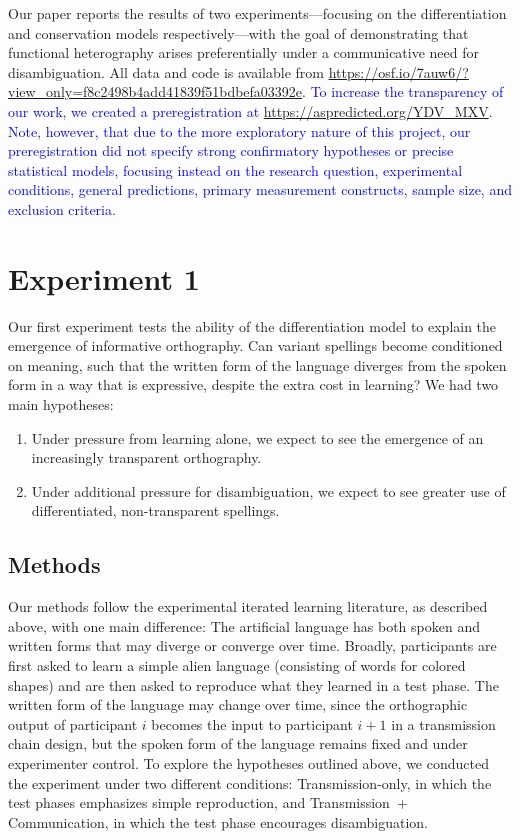 \documentclass[doc,biblatex]{apa7}
\newcommand\newmaterial[1]{\textcolor{blue}{#1}}
\begin{document}
Our paper reports the results of two experiments---focusing on the differentiation and conservation models respectively---with the goal of demonstrating that functional heterography arises preferentially under a communicative need for disambiguation. All data and code is available from \url{https://osf.io/7auw6/?view_only=f8c2498b4add41839f51bdbefa03392e}. \newmaterial{To increase the transparency of our work, we created a preregistration at \url{https://aspredicted.org/YDV_MXV}. Note, however, that due to the more exploratory nature of this project, our preregistration did not specify strong confirmatory hypotheses or precise statistical models, focusing instead on the research question, experimental conditions, general predictions, primary measurement constructs, sample size, and exclusion criteria.}


\section{Experiment 1}

Our first experiment tests the ability of the differentiation model to explain the emergence of informative orthography. Can variant spellings become conditioned on meaning, such that the written form of the language diverges from the spoken form in a way that is expressive, despite the extra cost in learning? We had two main hypotheses:
\begin{enumerate}
	\item Under pressure from learning alone, we expect to see the emergence of an increasingly transparent orthography.
	\item Under additional pressure for disambiguation, we expect to see greater use of differentiated, non-transparent spellings.
\end{enumerate}

\subsection{Methods}

Our methods follow the experimental iterated learning literature, as described above, with one main difference: The artificial language has both spoken and written forms that may diverge or converge over time. Broadly, participants are first asked to learn a simple alien language (consisting of words for colored shapes) and are then asked to reproduce what they learned in a test phase. The written form of the language may change over time, since the orthographic output of participant $i$ becomes the input to participant $i+1$ in a transmission chain design, but the spoken form of the language remains fixed and under experimenter control. To explore the hypotheses outlined above, we conducted the experiment under two different conditions: Transmission-only, in which the test phases emphasizes simple reproduction, and Transmission~+ Communication, in which the test phase encourages disambiguation.
\end{document}
